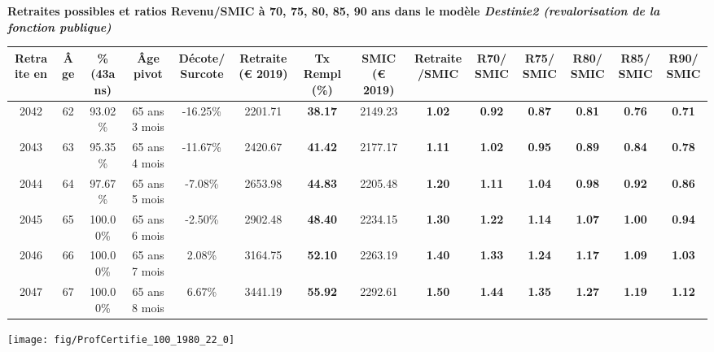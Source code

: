  \vspace{0.1cm} 
{\bf \noindent Retraites possibles et ratios Revenu/SMIC à 70, 75, 80, 85, 90 ans dans le modèle \emph{Destinie2 (revalorisation de la fonction publique)}}  
 
\begin{adjustbox}{max width=\textwidth} 
\begin{tabular}[htb]{|c|c||c|c|c||c|c||c|c||c|c|c|c|c|} 
\hline 
 Retraite en &  Âge &  \%(43ans) &  Âge pivot &  Décote/Surcote &  Retraite (\euro{} 2019) &  Tx Rempl(\%) &  SMIC (\euro{} 2019) &  Retraite/SMIC &  R70/SMIC &  R75/SMIC &  R80/SMIC &  R85/SMIC &  R90/SMIC \\ 
\hline \hline 
 2042 &  62 &  93.02\% &  65 ans 3 mois &  -16.25\% &  2201.71 &  {\bf 38.17} &  2149.23 &  {\bf 1.02} &  {\bf {\color{red} 0.92}} &  {\bf {\color{red} 0.87}} &  {\bf {\color{red} 0.81}} &  {\bf {\color{red} 0.76}} &  {\bf {\color{red} 0.71}} \\ 
\hline 
 2043 &  63 &  95.35\% &  65 ans 4 mois &  -11.67\% &  2420.67 &  {\bf 41.42} &  2177.17 &  {\bf 1.11} &  {\bf 1.02} &  {\bf {\color{red} 0.95}} &  {\bf {\color{red} 0.89}} &  {\bf {\color{red} 0.84}} &  {\bf {\color{red} 0.78}} \\ 
\hline 
 2044 &  64 &  97.67\% &  65 ans 5 mois &  -7.08\% &  2653.98 &  {\bf 44.83} &  2205.48 &  {\bf 1.20} &  {\bf 1.11} &  {\bf 1.04} &  {\bf {\color{red} 0.98}} &  {\bf {\color{red} 0.92}} &  {\bf {\color{red} 0.86}} \\ 
\hline 
 2045 &  65 &  100.00\% &  65 ans 6 mois &  -2.50\% &  2902.48 &  {\bf 48.40} &  2234.15 &  {\bf 1.30} &  {\bf 1.22} &  {\bf 1.14} &  {\bf 1.07} &  {\bf 1.00} &  {\bf {\color{red} 0.94}} \\ 
\hline 
 2046 &  66 &  100.00\% &  65 ans 7 mois &  2.08\% &  3164.75 &  {\bf 52.10} &  2263.19 &  {\bf 1.40} &  {\bf 1.33} &  {\bf 1.24} &  {\bf 1.17} &  {\bf 1.09} &  {\bf 1.03} \\ 
\hline 
 2047 &  67 &  100.00\% &  65 ans 8 mois &  6.67\% &  3441.19 &  {\bf 55.92} &  2292.61 &  {\bf 1.50} &  {\bf 1.44} &  {\bf 1.35} &  {\bf 1.27} &  {\bf 1.19} &  {\bf 1.12} \\ 
\hline 
\hline 
\end{tabular} 
\end{adjustbox} 
 
 \vspace{0.1cm} 

 {\hspace{-2.2cm}\texttt{[image: fig/ProfCertifie\_100\_1980\_22\_0]}} 

